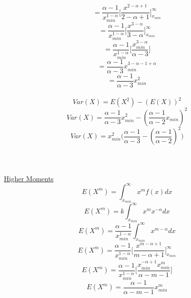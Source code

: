 \documentclass[14pt, a4paper]{article}
\theoremstyle{definition}
\begin{document}
\[  =  \frac{\alpha - 1 }{x_{min}^{1-\alpha}} \Big[ \frac{x^{2 -\alpha+1}}{2- \alpha +1} \Big]^\infty_{x_{min}} \]
\[  =  \frac{\alpha - 1 }{x_{min}^{1-\alpha}} \Big[ \frac{x^{3 -\alpha}}{3 - \alpha } \Big]^\infty_{x_{min}} \]
\[  =  \frac{\alpha - 1 }{x_{min}^{1-\alpha}} \Big[ \frac{x_{min}^{3 -\alpha}}{\alpha - 3 } \Big] \]
\[  =  \frac{\alpha - 1 }{\alpha - 3} x_{min}^{3 -\alpha - 1+ \alpha}\]
\[ = \frac{\alpha - 1 }{\alpha - 3} x_{min}^2\]
\\
\[ Var(X) = E(X^2) - (E(X))^2\]
\[ Var(X) = \frac{\alpha - 1 }{\alpha - 3} x_{min}^2 - (\frac{\alpha - 1}{\alpha - 2} x_{min})^2\]
\[ Var(X) = x_{min}^2 \Big( \frac{\alpha -1}{\alpha - 3} - (\frac{\alpha - 1}{\alpha - 2}) ^2\Big)\]
\\ 
\\ 
\\ \underline{Higher Moments}
\[ E(X^m) = \int^\infty_{x_{min}} x^m f(x) dx \] 
\[ E(X^m) = k \int^\infty_{x_{min}} x^m x^{-\alpha} dx\]
\[ E(X^m) = \frac{\alpha - 1}{x_{min}^{1 -\alpha}} \int^\infty_{x_{min}} x^{m-\alpha} dx\]
\[ E(X^m) = \frac{\alpha - 1}{x_{min}^{1 -\alpha}} \Big[ \frac{x^{m-\alpha + 1}}{m- \alpha +1} \Big]^\infty _{x_{min}} \]
\[ E(X^m) = \frac{\alpha - 1}{x_{min}^{1 -\alpha}} \Big[ \frac{x_{min}^{-\alpha + 1} x_{min}^m}{\alpha -m  -1} \Big] \]
\[ E(X^m) = \frac{\alpha - 1}{\alpha - m - 1} x_{min}^m\]








 
\end{document}
